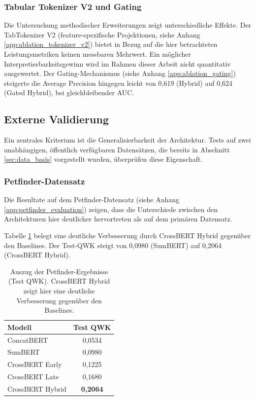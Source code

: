 \subsubsection{Tabular Tokenizer V2 und Gating}
\label{sec:res_ablation_extensions}

Die Untersuchung methodischer Erweiterungen zeigt unterschiedliche Effekte. Der TabTokenizer V2 (feature-spezifische Projektionen, siehe Anhang \ref{app:ablation_tokenizer_v2}) bietet in Bezug auf die hier betrachteten Leistungsmetriken keinen messbaren Mehrwert. Ein möglicher Interpretierbarkeitsgewinn wird im Rahmen dieser Arbeit nicht quantitativ ausgewertet. Der Gating-Mechanismus (siehe Anhang \ref{app:ablation_gating}) steigerte die Average Precision hingegen leicht von 0{,}619 (Hybrid) auf 0{,}624 (Gated Hybrid), bei gleichbleibender AUC.

\subsection{Externe Validierung}
\label{sec:res_external_validation}

Ein zentrales Kriterium ist die Generalisierbarkeit der Architektur. Tests auf zwei unabhängigen, öffentlich verfügbaren Datensätzen, die bereits in Abschnitt \ref{sec:data_basis} vorgestellt wurden, überprüfen diese Eigenschaft.

\subsubsection{Petfinder-Datensatz}
Die Resultate auf dem Petfinder-Datensatz (siehe Anhang \ref{app:petfinder_evaluation}) zeigen, dass die Unterschiede zwischen den Architekturen hier deutlicher hervortreten als auf dem primären Datensatz.

Tabelle \ref{tab:petfinder_summary} belegt eine deutliche Verbesserung durch CrossBERT Hybrid gegenüber den Baselines. Der Test-QWK steigt von 0{,}0980 (SumBERT) auf 0{,}2064 (CrossBERT Hybrid).

\begin{table}[h]
    \centering
    \small
    \caption{Auszug der Petfinder-Ergebnisse (Test QWK). CrossBERT Hybrid zeigt hier eine deutliche Verbesserung gegenüber den Baselines.}
    \label{tab:petfinder_summary}
    \begin{tabular}{lc}
        \hline
        \textbf{Modell} & \textbf{Test QWK} \\
        \hline
        ConcatBERT & 0{,}0534 \\
        SumBERT & 0{,}0980 \\
        CrossBERT Early & 0{,}1225 \\
        CrossBERT Late & 0{,}1680 \\
        CrossBERT Hybrid & \textbf{0{,}2064} \\
        \hline
    \end{tabular}
\end{table}

